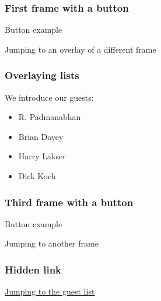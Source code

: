 \documentclass{beamer}
\begin{document}
\begin{frame}
\frametitle{First frame with a button}

Button example

Jumping to an overlay of a different frame
\bigskip

\hyperlink{fourguests<3>}%
{}
\end{frame}

\begin{frame}[label=fourguests]
\frametitle{Overlaying lists}

We introduce our guests:
\begin{itemize}
\item<1-> R. Padmanabhan
\item<2-> Brian Davey
\item<3-> Harry Lakser
\item<4-> Dick Koch
\end{itemize}

\hyperlink{fourguests<3>}%
{}
\end{frame}

\begin{frame}
\frametitle{Third frame with a button}

Button example

Jumping to another frame
\bigskip

\hyperlink{fourguests}%
{}
\end{frame}

\begin{frame}
\frametitle{Hidden link}

\hyperlink{fourguests}{Jumping to the guest list}
\end{frame}
\end{document}

